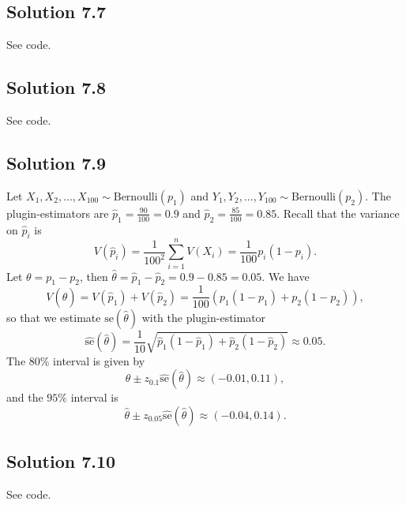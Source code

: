 \subsection*{Solution 7.7}

See code.


\subsection*{Solution 7.8}

See code.


\subsection*{Solution 7.9}

Let $X_1, X_2, ..., X_{100} \sim \mathrm{Bernoulli}(p_1)$ and $Y_1, Y_2, ..., Y_{100} \sim \mathrm{Bernoulli}(p_2)$.
The plugin-estimators are $\hat{p}_1 = \frac{90}{100} = 0.9$ and $\hat{p}_2 = \frac{85}{100} = 0.85$.
Recall that the variance on $\hat{p}_i$ is
\begin{equation*}
    V(\hat{p}_i) = \frac{1}{100^2} \sum_{i = 1}^n V(X_i)
        = \frac{1}{100} p_i(1 - p_i).
\end{equation*}
Let $\theta = p_1 - p_2$, then $\hat{\theta} = \hat{p}_1 - \hat{p}_2 = 0.9 - 0.85 = 0.05$.
We have
\begin{equation*}
    V(\hat{\theta})
        = V(\hat{p}_1) + V(\hat{p}_2)
        = \frac{1}{100}(p_1(1 - p_1) + p_2(1 - p_2)),
\end{equation*}
so that we estimate $\mathrm{se}(\hat{\theta})$ with the plugin-estimator
\begin{equation*}
    \hat{\mathrm{se}}(\hat{\theta})
        = \frac{1}{10} \sqrt{\hat{p}_1(1 - \hat{p}_1) + \hat{p}_2(1 - \hat{p}_2)}
        \approx 0.05.
\end{equation*}
The $80\%$ interval is given by
\begin{equation*}
    \hat{\theta} \pm z_{0.1} \hat{\mathrm{se}}(\hat{\theta})
        \approx (-0.01, 0.11),
\end{equation*}
and the $95\%$ interval is
\begin{equation*}
    \hat{\theta} \pm z_{0.05} \hat{\mathrm{se}}(\hat{\theta})
        \approx (-0.04, 0.14).
\end{equation*}


\subsection*{Solution 7.10}

See code.

